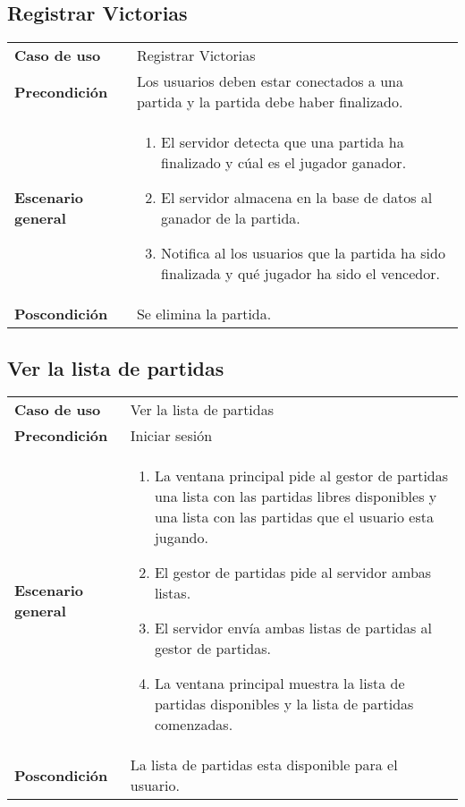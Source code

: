 \subsection{Registrar Victorias}
{\footnotesize
\begin{tabularx}{0.95\textwidth}{p{}|X}

\textbf{Caso de uso} & Registrar Victorias \\

\textbf{Precondición} & Los usuarios deben estar conectados a una partida y la partida debe haber finalizado.\\

\textbf{Escenario general} & \begin{enumerate}
\item El servidor detecta que una partida ha finalizado y cúal es el jugador ganador.
\item El servidor almacena en la base de datos al ganador de la partida.
\item Notifica al los usuarios que la partida ha sido finalizada y qué jugador ha sido el vencedor.

\end{enumerate} \\

\textbf{Poscondición} & Se elimina la partida.

\end{tabularx}
}

\subsection{Ver la lista de partidas}

{\footnotesize
\begin{tabularx}{0.95\textwidth}{p{}|X}

\textbf{Caso de uso} & Ver la lista de partidas \\

\textbf{Precondición} & Iniciar sesión \\

\textbf{Escenario general} & \begin{enumerate}
\item La ventana principal pide al gestor de partidas una lista con las
partidas libres disponibles y una lista con las partidas que el usuario esta
jugando.
\item El gestor de partidas pide al servidor ambas listas.
\item El servidor envía ambas listas de partidas al gestor de partidas.
\item La ventana principal muestra la lista de partidas disponibles y la lista
de partidas comenzadas.

\end{enumerate} \\

\textbf{Poscondición} & La lista de partidas esta disponible para el usuario.

\end{tabularx}
}

